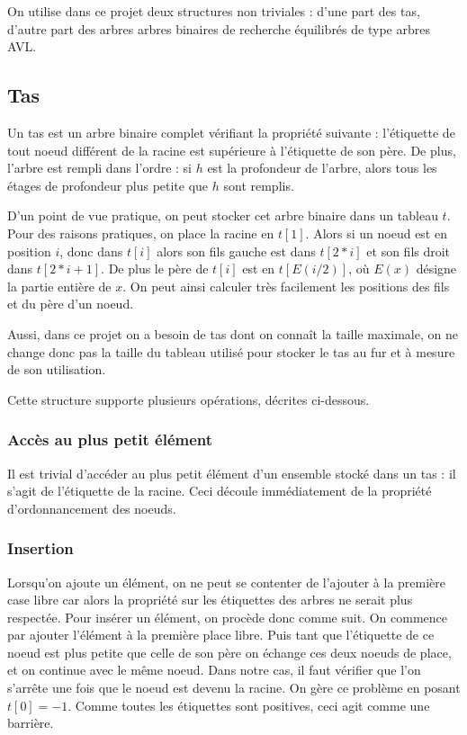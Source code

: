\documentclass{article}
\begin{document}
On utilise dans ce projet deux structures non triviales : d'une part des tas, d'autre part des arbres arbres binaires de recherche équilibrés de type arbres AVL.
\subsection{Tas}

Un tas est un arbre binaire complet vérifiant la propriété suivante : l'étiquette de tout noeud différent de la racine est supérieure à l'étiquette de son père.
De plus, l'arbre est rempli \og dans l'ordre \fg : si $h$ est la profondeur de l'arbre, alors tous les étages de profondeur plus petite que $h$ sont remplis.

D'un point de vue pratique, on peut stocker cet arbre binaire dans un tableau $t$. Pour des raisons pratiques, on place la racine en $t[1]$. Alors si un noeud est
en position $i$, donc dans $t[i]$ alors son fils gauche est dans $t[2*i]$ et son fils droit dans $t[2*i+1]$. De plus le père de $t[i]$ est en $t[E(i/2)]$, où $E(x)$
désigne la partie entière de $x$. On peut ainsi calculer très facilement les positions des fils et du père d'un noeud.

Aussi, dans ce projet on a besoin de tas dont on connaît la taille maximale, on ne change donc pas la taille du tableau utilisé pour stocker le tas au fur et à mesure
de son utilisation.

Cette structure supporte plusieurs opérations, décrites ci-dessous.

\subsubsection{Accès au plus petit élément}
Il est trivial d'accéder au plus petit élément d'un ensemble stocké dans un tas : il s'agit de l'étiquette de la racine. Ceci découle immédiatement de la propriété
d'ordonnancement des noeuds.


\subsubsection{Insertion}
Lorsqu'on ajoute un élément, on ne peut se contenter de l'ajouter à la première case libre car alors la propriété sur les étiquettes des arbres ne serait plus respectée.
Pour insérer un élément, on procède donc comme suit. On commence par ajouter l'élément à la première place libre. Puis tant que l'étiquette de ce noeud est plus 
petite que celle de son père on échange ces deux noeuds de place, et on continue avec le même noeud. Dans notre cas, il faut vérifier que l'on s'arrête une fois que
le noeud est devenu la racine. On gère ce problème en posant $t[0] = -1$. Comme toutes les étiquettes sont positives, ceci agit comme une barrière.
\end{document}
